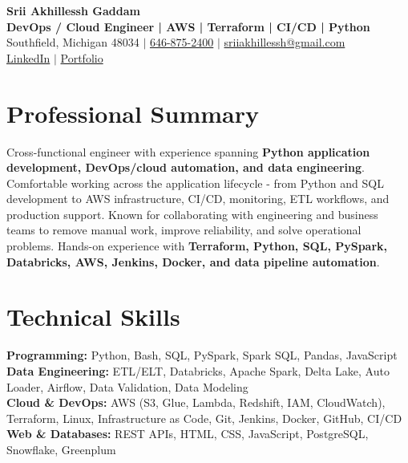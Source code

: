 \documentclass[letterpaper,10pt]{article}
\begin{document}
\fontsize{9.35pt}{10.45pt}\selectfont

\begin{center}
    {\LARGE \textbf{Srii Akhillessh Gaddam}} \\[-1pt]
    \textbf{DevOps / Cloud Engineer | AWS | Terraform | CI/CD | Python} \\[2pt]
    Southfield, Michigan 48034 $|$
    \href{tel:6468752400}{646-875-2400} $|$
    \href{mailto:sriiakhillessh@gmail.com}{sriiakhillessh@gmail.com} \\[1pt]
    \href{https://www.linkedin.com/in/srii-akhiilessh-gaddam-b48668191/}{LinkedIn} $|$
    \href{https://sriiakhillesshg.github.io/portfolio/}{Portfolio}
\end{center}
\vspace{-8pt}

\section{Professional Summary}
\small{Cross-functional engineer with experience spanning \textbf{Python application development, DevOps/cloud automation, and data engineering}. Comfortable working across the application lifecycle - from Python and SQL development to AWS infrastructure, CI/CD, monitoring, ETL workflows, and production support. Known for collaborating with engineering and business teams to remove manual work, improve reliability, and solve operational problems. Hands-on experience with \textbf{Terraform, Python, SQL, PySpark, Databricks, AWS, Jenkins, Docker, and data pipeline automation}.}

\section{Technical Skills}
\small{
\textbf{Programming:} Python, Bash, SQL, PySpark, Spark SQL, Pandas, JavaScript \\
\textbf{Data Engineering:} ETL/ELT, Databricks, Apache Spark, Delta Lake, Auto Loader, Airflow, Data Validation, Data Modeling \\
\textbf{Cloud \& DevOps:} AWS (S3, Glue, Lambda, Redshift, IAM, CloudWatch), Terraform, Linux, Infrastructure as Code, Git, Jenkins, Docker, GitHub, CI/CD \\
\textbf{Web \& Databases:} REST APIs, HTML, CSS, JavaScript, PostgreSQL, Snowflake, Greenplum
}
\end{document}
